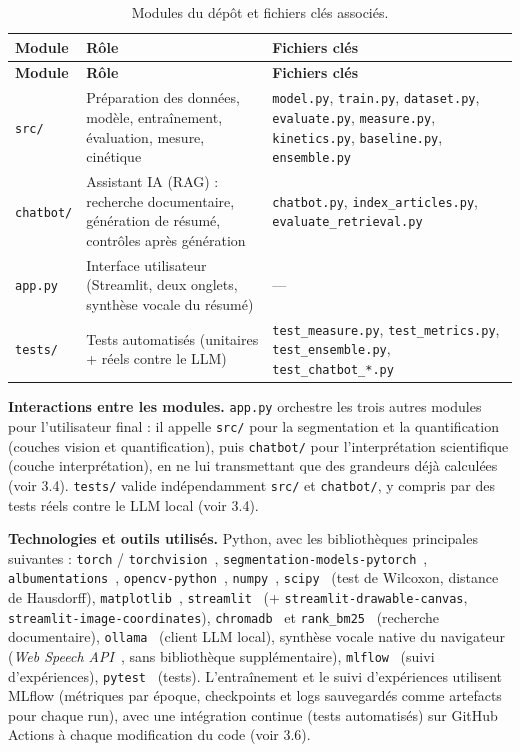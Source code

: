\documentclass[12pt,a4paper]{report}
\begin{document}
\begin{longtable}{p{2.3cm} p{5.5cm} p{5.5cm}}
\caption{Modules du dépôt et fichiers clés associés.}
\label{tab:modules} \\
\toprule
\textbf{Module} & \textbf{Rôle} & \textbf{Fichiers clés} \\
\midrule
\endfirsthead
\toprule
\textbf{Module} & \textbf{Rôle} & \textbf{Fichiers clés} \\
\midrule
\endhead
\texttt{src/} & Préparation des données, modèle, entraînement, évaluation, mesure, cinétique & \texttt{model.py}, \texttt{train.py}, \texttt{dataset.py}, \texttt{evaluate.py}, \texttt{measure.py}, \texttt{kinetics.py}, \texttt{baseline.py}, \texttt{ensemble.py} \\
\texttt{chatbot/} & Assistant IA (RAG) : recherche documentaire, génération de résumé, contrôles après génération & \texttt{chatbot.py}, \texttt{index\_articles.py}, \texttt{evaluate\_retrieval.py} \\
\texttt{app.py} & Interface utilisateur (Streamlit, deux onglets, synthèse vocale du résumé) & --- \\
\texttt{tests/} & Tests automatisés (unitaires + réels contre le LLM) & \texttt{test\_measure.py}, \texttt{test\_metrics.py}, \texttt{test\_ensemble.py}, \texttt{test\_chatbot\_*.py} \\
\bottomrule
\end{longtable}

\textbf{Interactions entre les modules.} \texttt{app.py} orchestre les trois autres modules pour l'utilisateur final : il appelle \texttt{src/} pour la segmentation et la quantification (couches vision et quantification), puis \texttt{chatbot/} pour l'interprétation scientifique (couche interprétation), en ne lui transmettant que des grandeurs déjà calculées (voir 3.4). \texttt{tests/} valide indépendamment \texttt{src/} et \texttt{chatbot/}, y compris par des tests réels contre le LLM local (voir 3.4).

\textbf{Technologies et outils utilisés.} Python, avec les bibliothèques principales suivantes : \texttt{torch} / \texttt{torchvision}~\cite{ref25}, \texttt{segmentation-models-pytorch}~\cite{ref26}, \texttt{albumentations}~\cite{ref27}, \texttt{opencv-python}~\cite{ref28}, \texttt{numpy}~\cite{ref29}, \texttt{scipy}~\cite{ref30} (test de Wilcoxon, distance de Hausdorff), \texttt{matplotlib}~\cite{ref31}, \texttt{streamlit}~\cite{ref32} (+ \texttt{streamlit-drawable-canvas}, \texttt{streamlit-image-coordinates}), \texttt{chromadb}~\cite{ref33} et \texttt{rank\_bm25}~\cite{ref34,ref35} (recherche documentaire), \texttt{ollama}~\cite{ref36} (client LLM local), synthèse vocale native du navigateur (\textit{Web Speech API}~\cite{ref37}, sans bibliothèque supplémentaire), \texttt{mlflow}~\cite{ref38} (suivi d'expériences), \texttt{pytest}~\cite{ref39} (tests). L'entraînement et le suivi d'expériences utilisent MLflow (métriques par époque, checkpoints et logs sauvegardés comme artefacts pour chaque run), avec une intégration continue (tests automatisés) sur GitHub Actions à chaque modification du code (voir 3.6).
\end{document}
